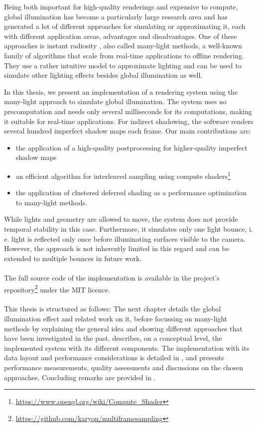 Being both important for high-quality renderings and expensive to compute, global illumination has become a particularly large research area and has generated a lot of different approaches for simulating or approximating it, each with different application areas, advantages and disadvantages. One of these approaches is instant radiosity \citep{Keller:1997:InstantRadiosity}, also called many-light methods, a well-known family of algorithms that scale from real-time applications to offline rendering. They use a rather intuitive model to approximate lighting and can be used to simulate other lighting effects besides global illumination as well.

In this thesis, we present an implementation of a rendering system using the many-light approach to simulate global illumination. The system uses no precomputation and needs only several milliseconds for its computations, making it suitable for real-time applications. For indirect shadowing, the software renders several hundred imperfect shadow maps \citep{ritschel2008ism} each frame. Our main contributions are:
\begin{itemize}
    \item the application of a high-quality postprocessing for higher-quality imperfect shadow maps
    \item an efficient algorithm for interleaved sampling \citep{Keller:2001:InterleavedSampling} using compute shaders\footnote{\url{https://www.opengl.org/wiki/Compute_Shader}}
    \item the application of clustered deferred shading \citep{olsson2012clustered} as a performance optimization to many-light methods.
\end{itemize}

While lights and geometry are allowed to move, the system does not provide temporal stability in this case. Furthermore, it simulates only one light bounce, i.\,e. light is reflected only once before illuminating surfaces visible to the camera. However, the approach is not inherently limited in this regard and can be extended to multiple bounces in future work.
\\
\\
The full source code of the implementation is available in the project's repository\footnote{\url{https://github.com/karyon/multiframesampling}} under the MIT licence.
\\
\\
This thesis is structured as follows: The next chapter details the global illumination effect and related work on it, before focussing on many-light methods by explaining the general idea and showing different approaches that have been investigated in the past.  describes, on a conceptual level, the implemented system with its different components. The implementation with its data layout and performance considerations is detailed in , and  presents performance measurements, quality assessments and discussions on the chosen approaches. Concluding remarks are provided in .


\cleardoublepage

